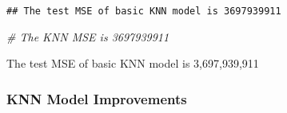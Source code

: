 \documentclass[
]{article}
\newenvironment{Shaded}{\begin{snugshade}}{\end{snugshade}}
\newcommand{\CommentTok}[1]{\textcolor[rgb]{0.56,0.35,0.01}{\textit{#1}}}
\begin{document}
\begin{verbatim}
## The test MSE of basic KNN model is 3697939911
\end{verbatim}

\begin{Shaded}
\begin{Highlighting}[]
\CommentTok{\# The KNN MSE is 3697939911 }
\end{Highlighting}
\end{Shaded}

The test MSE of basic KNN model is 3,697,939,911

\subsubsection{KNN Model Improvements}\label{knn-model-improvements}
\end{document}
